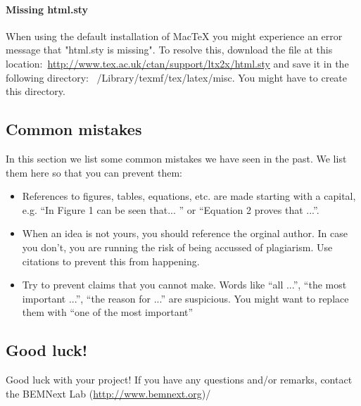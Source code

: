 \documentclass{latex-format/stylesheets/BEMNextstyle}
\begin{document}
\paragraph*{Missing html.sty}
When using the default installation of MacTeX you might experience an error message that "html.sty is missing". To resolve this, download the file at this location:~\url{http://www.tex.ac.uk/ctan/support/ltx2x/html.sty} and save it in the following directory: ~/Library/texmf/tex/latex/misc. You might have to create this directory.

\subsection*{Common mistakes}
In this section we list some common mistakes we have seen in the past. We list them here so that you can prevent them:
\begin{itemize}
\item References to figures, tables, equations, etc. are made starting with a capital, e.g. ``In Figure 1 can be seen that... '' or ``Equation 2 proves that ...''.
\item When an idea is not yours, you should reference the orginal author. In case you don't, you are running the risk of being accussed of plagiarism. Use citations to prevent this from happening.
\item Try to prevent claims that you cannot make. Words like ``all ...'', ``the most important ...'', ``the reason for ...'' are suspicious. You might want to replace them with ``one of the most important''
\end{itemize}

\subsection*{Good luck!}
Good luck with your project! If you have any questions and/or remarks, contact the BEMNext Lab (\url{http://www.bemnext.org})/
\end{document}
